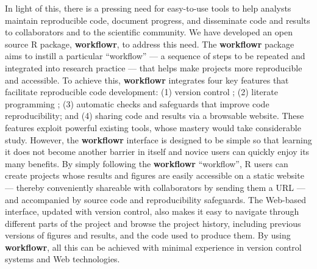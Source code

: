 \documentclass[9pt,a4paper]{extarticle}
\begin{document}
In light of this, there is a pressing need for easy-to-use tools to help
analysts maintain reproducible code, document progress, and disseminate
code and results to collaborators and to the scientific community. We
have developed an open source R \cite{R2019} package, \textbf{workflowr}, to
address this need. The \textbf{workflowr} package aims to instill a particular
``workflow'' --- a sequence of steps to be repeated and integrated into
research practice --- that helps make projects more reproducible and
accessible. To achieve this, \textbf{workflowr} integrates four key features that
facilitate reproducible code development: (1) version control
\cite{Loeliger2012, Chacon2014}; (2) literate programming
\cite{Xie2018}; (3) automatic checks and safeguards that improve code
reproducibility; and (4) sharing code and results via a browsable
website. These features exploit powerful existing tools, whose mastery
would take considerable study. However, the \textbf{workflowr} interface is
designed to be simple so that learning it does not become another
barrier in itself and novice users can quickly enjoy its many benefits.
By simply following the \textbf{workflowr} ``workflow'', R users can create
projects whose results and figures are easily accessible on a static
website --- thereby conveniently shareable with collaborators by sending
them a URL --- and accompanied by source code and reproducibility
safeguards. The Web-based interface, updated with version control, also
makes it easy to navigate through different parts of the project and
browse the project history, including previous versions of figures and
results, and the code used to produce them. By using \textbf{workflowr}, all this
can be achieved with minimal experience in version control systems and
Web technologies.
\end{document}

